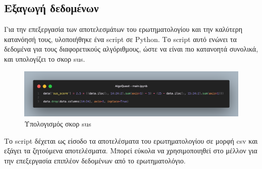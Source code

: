 \subsection{Εξαγωγή δεδομένων}

Για την επεξεργασία των αποτελεσμάτων του ερωτηματολογίου και την καλύτερη κατανόησή τους, υλοποιήθηκε ένα \gls{script} σε Python. Το \gls{script} αυτό ενώνει τα δεδομένα για τους διαφορετικούς αλγόριθμους, ώστε να είναι πιο κατανοητά συνολικά, και υπολογίζει το σκορ \acrshort{sus}.

\begin{figure}[H]
    \centering
    \includegraphics[width=1\linewidth]{sections/5/3/images/sus_score_calculation}
    \caption{Υπολογισμός σκορ \acrshort{sus}}
    \label{fig:sus_score_calculation}
\end{figure}

Το \gls{script} δέχεται ως είσοδο τα αποτελέσματα του ερωτηματολογίου σε μορφή \acrshort{csv} και εξάγει τα ζητούμενα αποτελέσματα. Μπορεί εύκολα να χρησιμοποιηθεί στο μέλλον για την επεξεργασία επιπλέον δεδομένων από το ερωτηματολόγιο.
